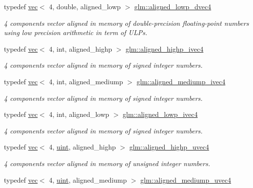 \begin{DoxyCompactItemize}
typedef \hyperlink{structglm_1_1vec}{vec}$<$ 4, double, aligned\+\_\+lowp $>$ \hyperlink{group__gtc__type__aligned_ga0c40d2f75a8bdae67116c4c973252baf}{glm\+::aligned\+\_\+lowp\+\_\+dvec4}
\begin{DoxyCompactList}\small\item\em 4 components vector aligned in memory of double-\/precision floating-\/point numbers using low precision arithmetic in term of U\+L\+Ps. \end{DoxyCompactList}\item 
typedef \hyperlink{structglm_1_1vec}{vec}$<$ 4, int, aligned\+\_\+highp $>$ \hyperlink{group__gtc__type__aligned_gabbac4883efc1760f4efb450753794f2d}{glm\+::aligned\+\_\+highp\+\_\+ivec4}
\begin{DoxyCompactList}\small\item\em 4 components vector aligned in memory of signed integer numbers. \end{DoxyCompactList}\item 
typedef \hyperlink{structglm_1_1vec}{vec}$<$ 4, int, aligned\+\_\+mediump $>$ \hyperlink{group__gtc__type__aligned_ga6960abdd6dda1c21b99d28894414ff67}{glm\+::aligned\+\_\+mediump\+\_\+ivec4}
\begin{DoxyCompactList}\small\item\em 4 components vector aligned in memory of signed integer numbers. \end{DoxyCompactList}\item 
typedef \hyperlink{structglm_1_1vec}{vec}$<$ 4, int, aligned\+\_\+lowp $>$ \hyperlink{group__gtc__type__aligned_ga45a747351d314655f410cbdb942eea41}{glm\+::aligned\+\_\+lowp\+\_\+ivec4}
\begin{DoxyCompactList}\small\item\em 4 components vector aligned in memory of signed integer numbers. \end{DoxyCompactList}\item 
typedef \hyperlink{structglm_1_1vec}{vec}$<$ 4, \hyperlink{group__core__precision_ga4fd29415871152bfb5abd588334147c8}{uint}, aligned\+\_\+highp $>$ \hyperlink{group__gtc__type__aligned_ga85553b476297f73c07bf3228ffb02d81}{glm\+::aligned\+\_\+highp\+\_\+uvec4}
\begin{DoxyCompactList}\small\item\em 4 components vector aligned in memory of unsigned integer numbers. \end{DoxyCompactList}\item 
typedef \hyperlink{structglm_1_1vec}{vec}$<$ 4, \hyperlink{group__core__precision_ga4fd29415871152bfb5abd588334147c8}{uint}, aligned\+\_\+mediump $>$ \hyperlink{group__gtc__type__aligned_gace9017071502bcfcd099532706881836}{glm\+::aligned\+\_\+mediump\+\_\+uvec4}

\end{DoxyCompactItemize}
